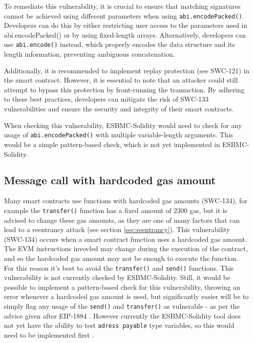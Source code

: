 To remediate this vulnerability, it is crucial to ensure that matching signatures cannot be achieved using different parameters when using \verb|abi.encodePacked()|. Developers can do this by either restricting user access to the parameters used in abi.encodePacked() or by using fixed-length arrays. Alternatively, developers can use \verb|abi.encode()| instead, which properly encodes the data structure and its length information, preventing ambiguous concatenation.

Additionally, it is recommended to implement replay protection (see SWC-121) in the smart contract. However, it is essential to note that an attacker could still attempt to bypass this protection by front-running the transaction. By adhering to these best practices, developers can mitigate the risk of SWC-133 vulnerabilities and ensure the security and integrity of their smart contracts.

When checking this vulnerability, ESBMC-Solidity would need to check for any usage of \verb|abi.encodePacked()| with multiple variable-length arguments. This would be a simple pattern-based check, which is not yet implemented in ESBMC-Solidity.

\subsection{Message call with hardcoded gas amount}
\label{sec:message_call_with_hardcoded_gas_amount}

Many smart contracts use functions with hardcoded gas amounts (SWC-134), for example the \verb|transfer()| function has a fixed amount of 2300 gas, but it is advised to change these gas amounts, as they are one of many factors that can lead to a reentrancy attack (see section \ref{sec:reentrancy}). This vulnerability (SWC-134) occurs when a smart contract function uses a hardcoded gas amount. The EVM instructions invovled may change during the execution of the contract, and so the hardcoded gas amount may not be enough to execute the function. For this reason it's best to avoid the \verb|transfer()| and \verb|send()| functions. This vulnerability is not currently checked by ESBMC-Solidity. Still, it would be possible to implement a pattern-based check for this vulnerability, throwing an error whenever a hardcoded gas amount is used, but significantly easier will be to simply flag any usage of the \verb|send()| and \verb|transfer()| as vulnerable - as per the advice given after EIP-1884 \cite{eip-1884}. However currently the ESBMC-Solidity tool does not yet have the ability to test \verb|adress payable| type variables, so this would need to be implemented first \cite{lawley2023esbmc}.


